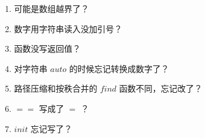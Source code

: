 \documentclass[E:/GsjzTle/main/main.tex]{subfiles}
\begin{document}
\begin{enumerate}
\def\labelenumi{\arabic{enumi}.}
\item
  可能是数组越界了？
\item
  数字用字符串读入没加引号？
\item
  函数没写返回值？
\item
  对字符串 \(auto\) 的时候忘记转换成数字了？
\item
  路径压缩和按秩合并的 \(find\) 函数不同，忘记改了？
\item
  \(==\) 写成了 \(=\) ？
\item
  \(init\) 忘记写了？
\end{enumerate}
\end{document}
